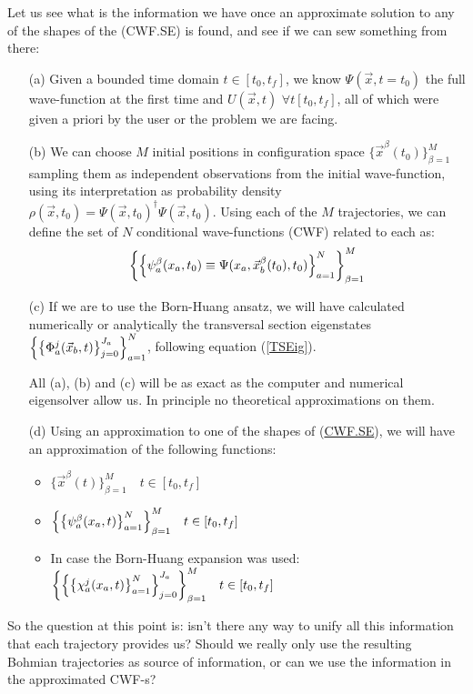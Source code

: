 \documentclass[11pt, a4paper]{article} %
\begin{document}
Let us see what is the information we have once an approximate solution to any of the shapes of the (CWF.SE) is found, and see if we can sew something from there:
\begin{enumerate}
\item[(a)] Given a bounded time domain $t\in [t_0,t_f]$, we know $\Psi(\vec{x},t=t_0)$ the full wave-function at the first time and $U(\vec{x},t)$ $\forall t[t_0,t_f]$, all of which were given a priori by the user or the problem we are facing.

\item[(b)] We can choose $M$ initial positions in configuration space $\{\vec{x}^\beta(t_0)\}_{\beta=1}^M$ sampling them as independent observations from the initial wave-function, using its interpretation as probability density $\rho(\vec{x},t_0)=\Psi(\vec{x},t_0)^\dagger \Psi(\vec{x},t_0)$. Using each of the $M$ trajectories, we can define the set of $N$ conditional wave-functions (CWF) related to each as:
$$
\qty{\qty{ \psi^\beta_a(x_a,t_0)\equiv\Psi(x_a,\vec{x}_b^\beta(t_0),t_0)}_{a=1}^N}_{\beta=1}^M
$$

\item[(c)] If we are to use the Born-Huang ansatz, we will have calculated numerically or analytically the transversal section eigenstates $\qty{ \qty{ \Phi_a^j(\vec{x}_b,t)}_{j=0}^{J_a}}_{a=1}^N$, following equation (\ref{TSEig}).

All (a), (b) and (c) will be as exact as the computer and numerical eigensolver allow us. In principle no theoretical approximations on them.

\item[(d)] Using an approximation to one of the shapes of (\hyperlink{CWF.SE}{CWF.SE}), we will have an approximation of the following functions: \begin{itemize}
\item $\{\vec{x}^\beta(t)\}_{\beta=1}^M \quad t \in [t_0, t_f]$
\item $\qty{\qty{ \psi^\beta_a(x_a,t)}_{a=1}^N}_{\beta=1}^M \quad t \in [t_0, t_f]$
\item In case the Born-Huang expansion was used: $\qty{\qty{\qty{ \chi_a^j(x_a,t)}_{a=1}^N}_{j=0}^{J_a}}_{\beta=1}^M \quad t \in [t_0, t_f]$
\end{itemize}
\end{enumerate}
So the question at this point is: isn't there any way to unify all this information that each trajectory provides us? Should we really only use the resulting Bohmian trajectories as source of information, or can we use the information in the approximated CWF-s?
\end{document}
